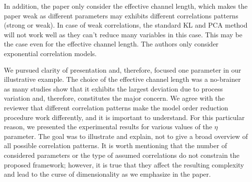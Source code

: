 \begin{reviewer}
In addition, the paper only consider the effective channel length, which makes the paper weak as different parameters may exhibits different correlations patterns (strong or weak). In case of weak correlations, the standard KL and PCA method will not work well as they can’t reduce many variables in this case. This may be the case even for the effective channel length. The authors only consider exponential correlation models.
\end{reviewer}
\begin{authors}
We pursued clarity of presentation and, therefore, focused one parameter in our illustrative example.
The choice of the effective channel length was a no-brainer as many studies show that it exhibits the largest deviation due to process variation and, therefore, constitutes the major concern.
We agree with the reviewer that different correlation patterns make the model order reduction procedure work differently, and it is important to understand.
For this particular reason, we presented the experimental results for various values of the $\eta$ parameter.
The goal was to illustrate and explain, not to give a broad overview of all possible correlation patterns.
It is worth mentioning that the number of considered parameters or the type of assumed correlations do not constrain the proposed framework; however, it is true that they affect the resulting complexity and lead to the curse of dimensionality as we emphasize in the paper.
\end{authors}

